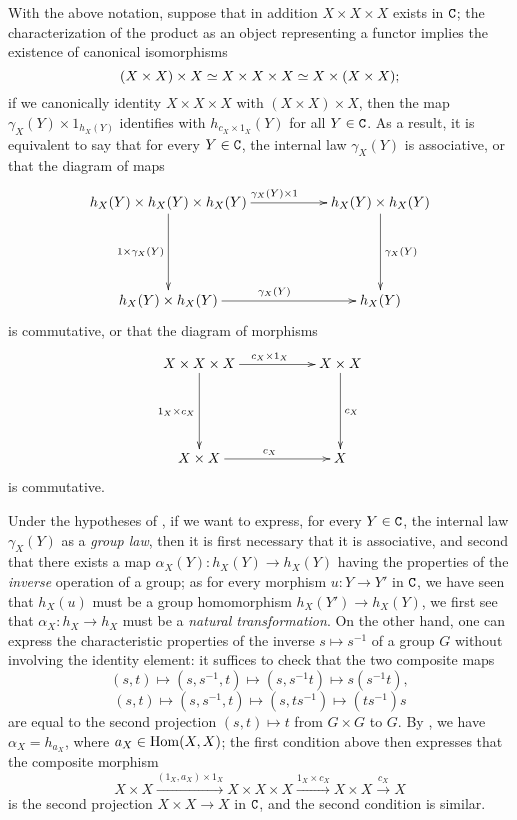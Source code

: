 \begin{env}[8.2.5]
\label{0.8.2.5}
With the above notation, suppose that in addition $X\times X\times X$ exists in $\mathtt{C}$; the characterization of the product as an object representing a functor  implies the existence of canonical isomorphisms
\[
  (X\times X)\times X\simeq X\times X\times X\simeq X\times(X\times X);
\]
if we canonically identity $X\times X\times X$ with $(X\times X)\times X$, then the map $\gamma_X(Y)\times 1_{h_X(Y)}$ identifies with $h_{c_X\times 1_X}(Y)$ for all $Y\in\mathtt{C}$.
As a result, it is equivalent to say that for every $Y\in\mathtt{C}$, the internal law $\gamma_X(Y)$ is associative, or that the diagram of maps
\[
  \xymatrix{
    h_X(Y)\times h_X(Y)\times h_X(Y)\ar[rr]^{\gamma_X(Y)\times 1}\ar[dd]_{1\times\gamma_X(Y)} & &
    h_X(Y)\times h_X(Y)\ar[dd]^{\gamma_X(Y)}\\\\
    h_X(Y)\times h_X(Y)\ar[rr]^{\gamma_X(Y)} & &
    h_X(Y)
  }
\]
is commutative, or that the diagram of morphisms
\[
  \xymatrix{
    X\times X\times X\ar[rr]^{c_X\times 1_X}\ar[dd]_{1_X\times c_X} & &
    X\times X\ar[dd]^{c_X}\\\\
    X\times X\ar[rr]^{c_X} & &
    X
  }
\]
is commutative.
\end{env}

\begin{env}[8.2.6]
\label{0.8.2.6}
Under the hypotheses of , if we want to express, for every $Y\in\mathtt{C}$, the internal law $\gamma_X(Y)$ as a \emph{group law}, then it is first necessary that it is associative, and second that there exists a map $\alpha_X(Y):h_X(Y)\to h_X(Y)$ having the properties of the \emph{inverse} operation of a group; as for every morphism $u:Y\to Y'$ in $\mathtt{C}$, we have seen that $h_X(u)$ must be a group homomorphism $h_X(Y')\to h_X(Y)$, we first see that $\alpha_X:h_X\to h_X$ must be a \emph{natural transformation}.
On the other hand, one can express the characteristic properties of the inverse $s\mapsto s^{-1}$ of a group $G$ without involving the identity element: it suffices to check that the two composite maps
\[
  (s,t)\mapsto(s,s^{-1},t)\mapsto(s,s^{-1}t)\mapsto s(s^{-1}t),
\]
\[
  (s,t)\mapsto(s,s^{-1},t)\mapsto(s,ts^{-1})\mapsto(ts^{-1})s
\]
are equal to the second projection $(s,t)\mapsto t$ from $G\times G$ to $G$.
By , we have $\alpha_X=h_{a_X}$, where $a_X\in{\mathop{\mathrm{Hom}}\nolimits}(X,X)$; the first condition above then expresses that the composite morphism
\[
  X\times X\xrightarrow{(1_X,a_X)\times 1_X}X\times X\times X\xrightarrow{1_X\times c_X}X\times X\xrightarrow{c_X}X
\]
is the second projection $X\times X\to X$ in $\mathtt{C}$, and the second condition is similar.
\end{env}

